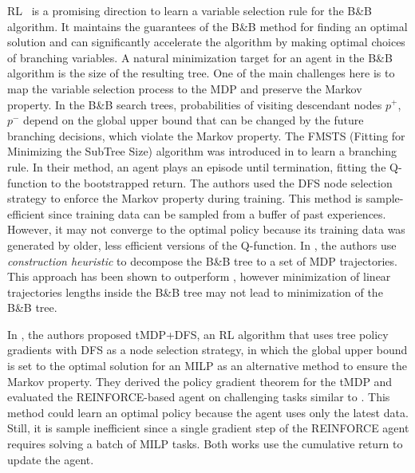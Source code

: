 \documentclass[preprint,12pt]{elsarticle} %
\theoremstyle{plain}
\theoremstyle{definition}
\theoremstyle{remark}
\begin{document}
RL~\cite{hildebrandt2023opportunities,torabi2025deep} is a promising direction to learn a variable selection rule for the B\&B algorithm. It maintains the guarantees of the B\&B method for finding an optimal solution and can significantly accelerate the algorithm by making optimal choices of branching variables. A natural minimization target for an agent in the B\&B algorithm is the size of the resulting tree. One of the main challenges here is to map the variable selection process to the MDP and preserve the Markov property. In the B\&B search trees, probabilities of visiting descendant nodes $p^+$, $p^-$ depend on the global upper bound that can be changed by the future branching decisions, which violate the Markov property. The FMSTS (Fitting for Minimizing the SubTree Size) algorithm was introduced in \cite{etheve_2020} to learn a branching rule. In their method, an agent plays an episode until termination, fitting the Q-function to the bootstrapped return. 
The authors used the DFS node selection strategy to enforce the Markov property during training. This method is sample-efficient since training data can be sampled from a buffer of past experiences. However, it may not converge to the optimal policy because its training data was generated by older, less efficient versions of the Q-function. In \cite{parsonson}, the authors use \textit{construction heuristic} to decompose the B\&B tree to a set of MDP trajectories. This approach has been shown to outperform \cite{etheve_2020}, however minimization of linear trajectories lengths inside the B\&B tree may not lead to minimization of the B\&B tree. 

In \cite{scavuzzo_2022}, the authors proposed tMDP+DFS, an RL algorithm that uses tree policy gradients with DFS as a node selection strategy, in which the global upper bound is set to the optimal solution for an MILP as an alternative method to ensure the Markov property. They derived the policy gradient theorem for the tMDP and evaluated the REINFORCE-based agent on challenging tasks similar to \cite{gasse_2019}. This method could learn an optimal policy because the agent uses only the latest data. Still, it is sample inefficient since a single gradient step of the REINFORCE agent requires solving a batch of MILP tasks. Both works \cite{etheve_2020,scavuzzo_2022} use the cumulative return to update the agent. 


\end{document}
